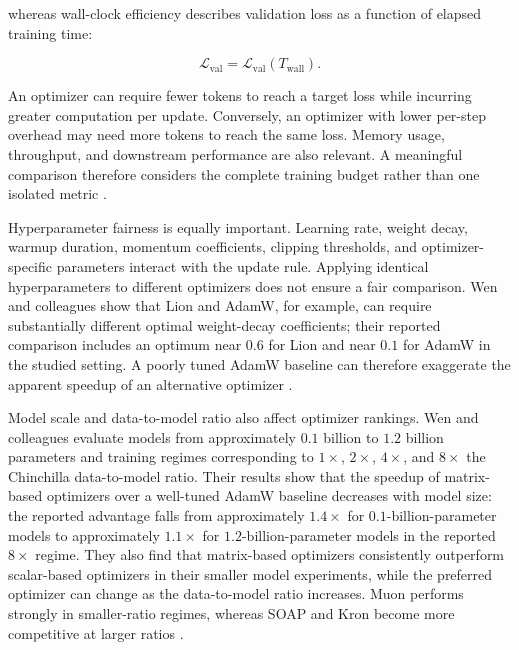 whereas wall-clock efficiency describes validation loss as a
function of elapsed training time:

\begin{equation}
    \mathcal{L}_{\mathrm{val}}
    =
    \mathcal{L}_{\mathrm{val}}(T_{\mathrm{wall}}).
    \label{eq:opt-wallclock-efficiency}
\end{equation}

An optimizer can require fewer tokens to reach a target loss while
incurring greater computation per update. Conversely, an optimizer
with lower per-step overhead may need more tokens to reach the same
loss. Memory usage, throughput, and downstream performance are
also relevant. A meaningful comparison therefore considers the
complete training budget rather than one isolated metric
\parencite{Ranganath2026Navigating,Wen2026Fantastic}.

Hyperparameter fairness is equally important. Learning rate,
weight decay, warmup duration, momentum coefficients, clipping
thresholds, and optimizer-specific parameters interact with the
update rule. Applying identical hyperparameters to different
optimizers does not ensure a fair comparison. Wen and colleagues
show that Lion and AdamW, for example, can require substantially
different optimal weight-decay coefficients; their reported
comparison includes an optimum near $0.6$ for Lion and near $0.1$
for AdamW in the studied setting. A poorly tuned AdamW baseline
can therefore exaggerate the apparent speedup of an alternative
optimizer \parencite{Wen2026Fantastic}.

Model scale and data-to-model ratio also affect optimizer rankings.
Wen and colleagues evaluate models from approximately $0.1$ billion
to $1.2$ billion parameters and training regimes corresponding to
$1\times$, $2\times$, $4\times$, and $8\times$ the Chinchilla
data-to-model ratio. Their results show that the speedup of
matrix-based optimizers over a well-tuned AdamW baseline decreases
with model size: the reported advantage falls from approximately
$1.4\times$ for $0.1$-billion-parameter models to approximately
$1.1\times$ for $1.2$-billion-parameter models in the reported
$8\times$ regime. They also find that matrix-based optimizers
consistently outperform scalar-based optimizers in their smaller
model experiments, while the preferred optimizer can change as
the data-to-model ratio increases. Muon performs strongly in
smaller-ratio regimes, whereas SOAP and Kron become more
competitive at larger ratios \parencite{Wen2026Fantastic}.

